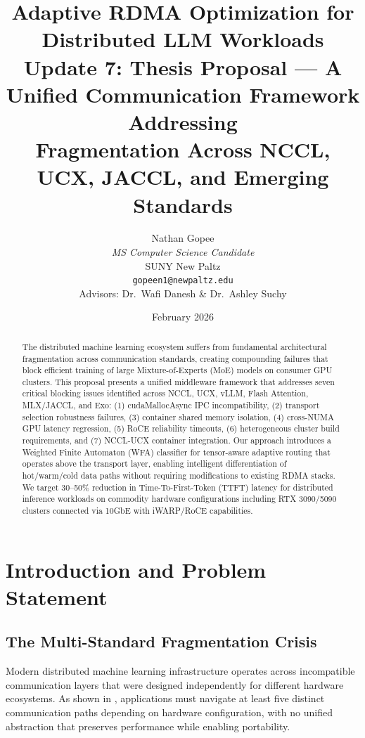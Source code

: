 \documentclass[11pt,letterpaper]{article}
\title{
    \vspace{-1cm}
    \textbf{Adaptive RDMA Optimization for Distributed LLM Workloads} \\[0.5em]
    \large Update 7: Thesis Proposal --- A Unified Communication Framework Addressing\\Fragmentation Across NCCL, UCX, JACCL, and Emerging Standards
}
\author{
    Nathan Gopee \\
    \textit{MS Computer Science Candidate} \\
    SUNY New Paltz \\
    \texttt{gopeen1@newpaltz.edu} \\[1em]
    \small Advisors: Dr.\ Wafi Danesh \& Dr.\ Ashley Suchy
}
\date{February 2026}
\theoremstyle{definition}
\begin{document}
\maketitle

\begin{abstract}
\noindent
The distributed machine learning ecosystem suffers from fundamental architectural fragmentation across communication standards, creating compounding failures that block efficient training of large Mixture-of-Experts (MoE) models on consumer GPU clusters. This proposal presents a unified middleware framework that addresses seven critical blocking issues identified across NCCL, UCX, vLLM, Flash Attention, MLX/JACCL, and Exo: (1) cudaMallocAsync IPC incompatibility, (2) transport selection robustness failures, (3) container shared memory isolation, (4) cross-NUMA GPU latency regression, (5) RoCE reliability timeouts, (6) heterogeneous cluster build requirements, and (7) NCCL-UCX container integration. Our approach introduces a Weighted Finite Automaton (WFA) classifier for tensor-aware adaptive routing that operates above the transport layer, enabling intelligent differentiation of hot/warm/cold data paths without requiring modifications to existing RDMA stacks. We target 30--50\% reduction in Time-To-First-Token (TTFT) latency for distributed inference workloads on commodity hardware configurations including RTX 3090/5090 clusters connected via 10GbE with iWARP/RoCE capabilities.
\end{abstract}

\tableofcontents
\newpage

\section{Introduction and Problem Statement}

\subsection{The Multi-Standard Fragmentation Crisis}

Modern distributed machine learning infrastructure operates across incompatible communication layers that were designed independently for different hardware ecosystems. As shown in , applications must navigate at least five distinct communication paths depending on hardware configuration, with no unified abstraction that preserves performance while enabling portability.
\end{document}
